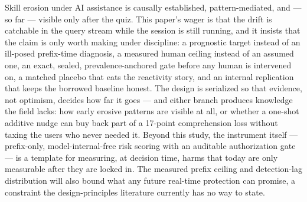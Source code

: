 \documentclass[11pt]{article}
\begin{document}
Skill erosion under AI assistance is causally established, pattern-mediated, and --- so far --- visible only after the quiz. This paper's wager is that the drift is catchable in the query stream while the session is still running, and it insists that the claim is only worth making under discipline: a prognostic target instead of an ill-posed prefix-time diagnosis, a measured human ceiling instead of an assumed one, an exact, sealed, prevalence-anchored gate before any human is intervened on, a matched placebo that eats the reactivity story, and an internal replication that keeps the borrowed baseline honest. The design is serialized so that evidence, not optimism, decides how far it goes --- and either branch produces knowledge the field lacks: how early erosive patterns are visible at all, or whether a one-shot additive nudge can buy back part of a 17-point comprehension loss without taxing the users who never needed it. Beyond this study, the instrument itself --- prefix-only, model-internal-free risk scoring with an auditable authorization gate --- is a template for measuring, at decision time, harms that today are only measurable after they are locked in. The measured prefix ceiling and detection-lag distribution will also bound what any future real-time protection can promise, a constraint the design-principles literature currently has no way to state.



\end{document}
